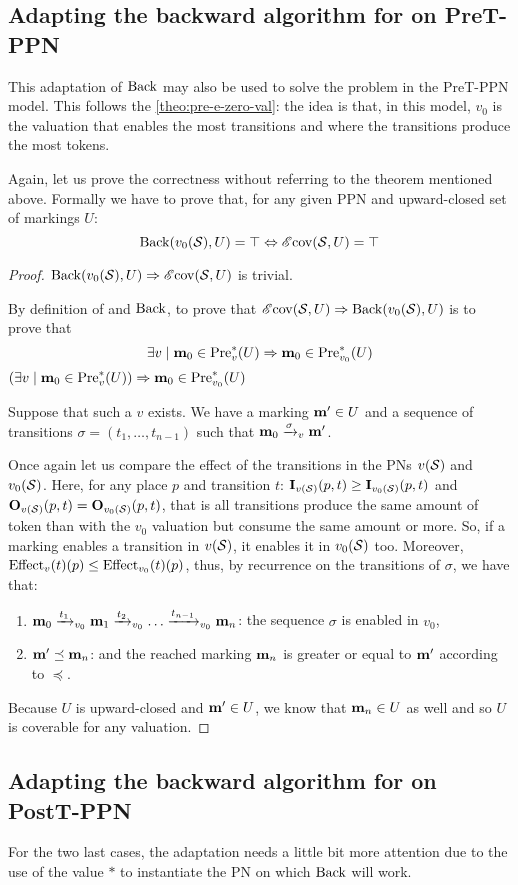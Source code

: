 
\subsection{Adapting the backward algorithm for \Ecov on PreT-\ac{PPN}}

This adaptation of $\operatorname{Back}$ may also be used to solve the \Ecov problem in the PreT-\ac{PPN} model.
This follows the \autoref{theo:pre-e-zero-val}:
the idea is that, in this model, $v_0$ is the valuation that enables the most transitions and where the transitions produce the most tokens.

Again, let us prove the correctness without referring to the theorem mentioned above.
Formally we have to prove that, for any given \ac{PPN} \SPTPm and upward-closed set of markings $U$:
  \[
    \operatorname{Back}(v_0(\mathcal{S}), U) = \top \Leftrightarrow \operatorname{\mathscr{E}cov}(\mathcal{S}, U) = \top
  \]

\begin{proof}
  $\operatorname{Back}(v_0(\mathcal{S}), U) \Rightarrow \operatorname{\mathscr{E}cov}(\mathcal{S}, U)$ is trivial.

  By definition of \Ecov and $\operatorname{Back}$, to prove that $\operatorname{\mathscr{E}cov}(\mathcal{S}, U) \Rightarrow \operatorname{Back}(v_0(\mathcal{S}), U)$ is to prove that
  \[
    \exists v \mid \mathbf{m}_0 \in \operatorname{Pre}^*_{v}(U) \Rightarrow \mathbf{m}_0 \in \operatorname{Pre}^*_{v_0}(U)
  \]
  $ \left( \exists v \mid \mathbf{m}_0 \in \operatorname{Pre}^*_{v}(U) \right) \Rightarrow \mathbf{m}_0 \in \operatorname{Pre}^*_{v_0}(U) $

  Suppose that such a $v$ exists. We have a marking $\mathbf{m'} \in U$ and a sequence of transitions $\sigma = (t_1, \dots, t_{n-1})$ such that $\mathbf{m}_0 \xrightarrow{\sigma}_v \mathbf{m'}$.

  Once again let us compare the effect of the transitions in the \acp{PN} $v(\mathcal{S})$ and $v_0(\mathcal{S})$. Here, for any place $p$ and transition $t$: $\mathbf{I}_{v(\mathcal{S})}(p,t) \geq \mathbf{I}_{v_0(\mathcal{S})}(p,t)$ and $\mathbf{O}_{v(\mathcal{S})}(p,t) = \mathbf{O}_{v_0(\mathcal{S})}(p,t)$, that is all transitions produce the same amount of token than with the $v_0$ valuation but consume the same amount or more. So, if a marking enables a transition in $v(\mathcal{S})$, it enables it in $v_0(\mathcal{S})$ too. Moreover, $\operatorname{Effect}_v(t)(p) \leq \operatorname{Effect}_{v_0}(t)(p)$, thus, by recurrence on the transitions of $\sigma$, we have that:
  \begin{enumerate}
    \item $\mathbf{m}_0 \xrightarrow{t_1}_{v_0} \mathbf{m}_1 \xrightarrow{t_2}_{v_0} \dots \xrightarrow{t_{n-1}}_{v_0} \mathbf{m}_n$: the sequence $\sigma$ is enabled in $v_0$,
    \item $\mathbf{m'} \preceq \mathbf{m}_n$: and the reached marking $\mathbf{m}_n$ is greater or equal to $\mathbf{m'}$ according to $\preceq$.
  \end{enumerate}

  Because $U$ is upward-closed and $\mathbf{m'} \in U$, we know that $\mathbf{m}_n \in U$ as well and so $U$ is coverable for any valuation.
\end{proof}

\subsection{Adapting the backward algorithm for \Ecov on PostT-\ac{PPN}}

For the two last cases, the adaptation needs a little bit more attention due to the use of the value $*$ to instantiate the \ac{PN} on which $\operatorname{Back}$ will work.

